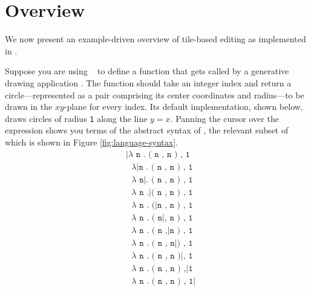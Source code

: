 \section{Overview}\label{sec:overview}






We now present an example-driven overview of tile-based
editing as implemented in \tylr.





Suppose you are using \tylr~ to define a function that gets called by a
generative drawing application .
The function should take an integer index and
return a circle---represented as a pair comprising
its center coordinates and radius---to be drawn in
the $xy$-plane for every index.
Its default implementation, shown below, draws circles
of radius \texttt{1} along the line $y = x$.
Panning the cursor over the expression shows you terms of
the abstract syntax of \tylr, the relevant subset of which
is shown in Figure \ref{fig:language-syntax}.
\begin{align*}
  & \texttt{|$\lambda$ n . ( n , n ) , 1} \\
  & \texttt{\ $\lambda$|n . ( n , n ) , 1} \\
  & \texttt{\ $\lambda$ n|. ( n , n ) , 1} \\
  & \texttt{\ $\lambda$ n .|( n , n ) , 1} \\
  & \texttt{\ $\lambda$ n . (|n , n ) , 1} \\
  & \texttt{\ $\lambda$ n . ( n|, n ) , 1} \\
  & \texttt{\ $\lambda$ n . ( n ,|n ) , 1} \\
  & \texttt{\ $\lambda$ n . ( n , n|) , 1} \\
  & \texttt{\ $\lambda$ n . ( n , n )|, 1} \\
  & \texttt{\ $\lambda$ n . ( n , n ) ,|1} \\
  & \texttt{\ $\lambda$ n . ( n , n ) , 1|}
\end{align*}

